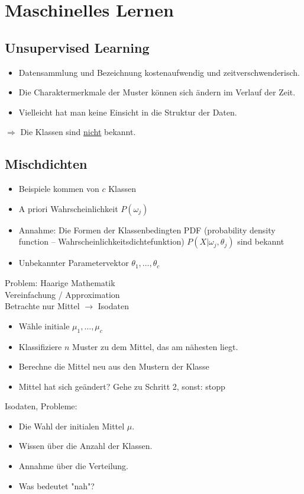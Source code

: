 
\section{Maschinelles Lernen}

\subsection{Unsupervised Learning}

\begin{itemize}
\item Datensammlung und Bezeichnung kostenaufwendig und zeitverschwenderisch.
\item Die Charaktermerkmale der Muster können sich ändern im Verlauf der Zeit.
\item Vielleicht hat man keine Einsicht in die Struktur der Daten.
\end{itemize}
$\Rightarrow$ Die Klassen sind \underline{nicht} bekannt.

\subsection{Mischdichten}

\begin{itemize}
\item Beispiele kommen von $c$ Klassen
\item A priori Wahrscheinlichkeit $P(\omega_j)$
\item Annahme: Die Formen der Klassenbedingten PDF (probability density function -- Wahrscheinlichkeitsdichtefunktion) $P(X | \omega_j , \theta_j)$ sind bekannt
\item Unbekannter Parametervektor $\theta_1, \dots, \theta_c$
\end{itemize}
Problem: Haarige Mathematik \\ Vereinfachung / Approximation \\ Betrachte nur Mittel $\to$ Isodaten
\begin{itemize}
\item Wähle initiale $\mu_1, \dots, \mu_c$
\item Klassifiziere $n$ Muster zu dem Mittel, das am nähesten liegt.
\item Berechne die Mittel neu aus den Mustern der Klasse
\item Mittel hat sich geändert? Gehe zu Schritt 2, sonst: stopp
\end{itemize}
Isodaten, Probleme:
\begin{itemize}
\item Die Wahl der initialen Mittel $\mu$.
\item Wissen über die Anzahl der Klassen.
\item Annahme über die Verteilung.
\item Was bedeutet "{}nah"{}?
\end{itemize}


